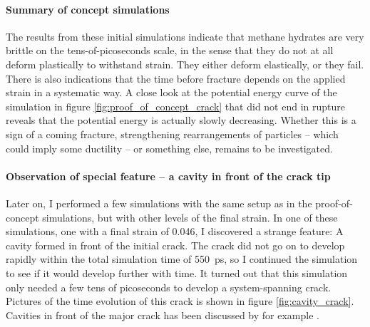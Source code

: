 \paragraph{Summary of concept simulations} The results from these initial simulations indicate that methane hydrates are very brittle on the tens-of-picoseconds scale, in the sense that they do not at all deform plastically to withstand strain. They either deform elastically, or they fail. There is also indications that the time before fracture depends on the applied strain in a systematic way. A close look at the potential energy curve of the simulation in figure \ref{fig:proof_of_concept_crack} that did not end in rupture reveals that the potential energy is actually slowly decreasing. Whether this is a sign of a coming fracture, strengthening rearrangements of particles -- which could imply some ductility -- or something else, remains to be investigated. 

\paragraph{Observation of special feature -- a cavity in front of the crack tip}
Later on, I performed a few simulations with the same setup as in the proof-of-concept simulations, but with other levels of the final strain. In one of these simulations, one with a final strain of 0.046, I discovered a strange feature: A cavity formed in front of the initial crack. The crack did not go on to develop rapidly within the total simulation time of \SI{550}{\pico\second}, so I continued the simulation to see if it would develop further with time. It turned out that this simulation only needed a few tens of picoseconds to develop a system-spanning crack. Pictures of the time evolution of this crack is shown in figure \ref{fig:cavity_crack}. Cavities in front of the major crack has been discussed by for example \citet{Bouchbinder2004}.

